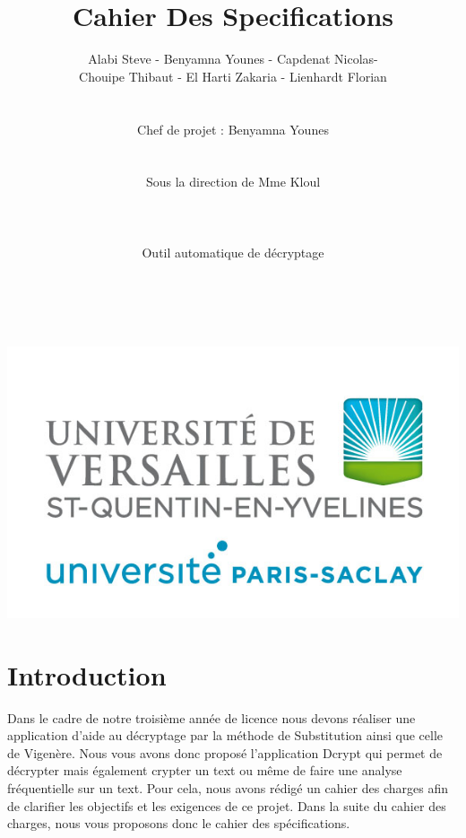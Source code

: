 \documentclass[a4]{article}
\begin{document}
	\title{\Huge{\textbf{Cahier Des Specifications}}}
	\author{Alabi Steve - Benyamna Younes - Capdenat Nicolas- \\
		Chouipe Thibaut - El Harti Zakaria - Lienhardt Florian \\ \\ \\
		Chef de projet : Benyamna Younes \\ \\ \\ 
		Sous la direction de Mme Kloul \\ \\ \\ \\
		Outil automatique de décryptage \\ \\ \\}
		

	\begin{titlepage}
		\maketitle
		\vspace{20em}
		\begin{center}\includegraphics{logo_uvsq.jpg}\end{center}
	\end{titlepage}
	\section{Introduction}
Dans le cadre de notre troisième année de licence nous devons réaliser une application d'aide au
décryptage par la méthode de Substitution ainsi que celle de Vigenère.
Nous vous avons donc proposé l'application Dcrypt qui permet de décrypter 
mais également crypter un text ou même de faire une analyse fréquentielle sur un text.
Pour cela, nous avons rédigé un cahier des charges afin de clarifier les objectifs et les 
exigences de ce projet. Dans la suite du cahier des charges, nous vous proposons donc
le cahier des spécifications.\\
\end{document}
